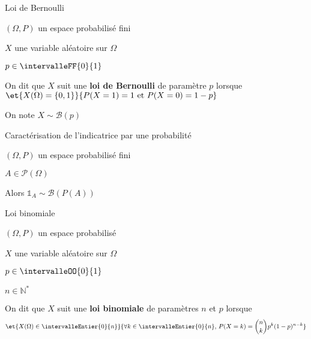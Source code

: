     \begin{defi}{Loi de Bernoulli}{}
        \begin{soient}
            \item $(\Omega,P)$ un espace probabilisé fini
            \item $X$ une variable aléatoire sur $\Omega$
            \item $p \in \intervalleFF{0}{1}$
        \end{soient}
        On dit que $X$ suit une \textbf{loi de Bernoulli} de paramètre $p$ lorsque $\et{X(\Omega) = \{0,1\}}{P(X=1) = 1 \text{ et } P(X=0)= 1-p}$ 
        
        On note $X \sim \mathcal{B}(p)$
    \end{defi}

    \begin{prop}{Caractérisation de l’indicatrice par une probabilité}{}
        \begin{soient}
            \item $(\Omega,P)$ un espace probabilisé fini
            \item $A \in \mathcal{P}(\Omega)$
        \end{soient}

        Alors $\mathbb{1}_A \sim \mathcal{B}(P(A))$
    \end{prop}

    \begin{defi}{Loi binomiale}{}
        \begin{soit}
            \item $(\Omega,P)$ un espace probabilisé
            \item $X$ une variable aléatoire sur $\Omega$
            \item $p \in \intervalleOO{0}{1}$
            \item $n \in \mathbb{N}^*$
        \end{soit}
        On dit que $X$ suit une \textbf{loi binomiale} de paramètres $n$ et $p$ lorsque 
        \[ \et{X(\Omega) \in \intervalleEntier{0}{n}}{\forall k \in \intervalleEntier{0}{n}, \, P(X=k) =\binom{n}{k} p^k (1-p)^{n-k}} \]
    \end{defi}

